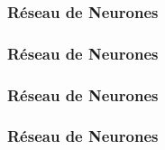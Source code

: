 \documentclass{formation}
\begin{document}
\begin{frame}
  \frametitle{Réseau de Neurones}
  
\end{frame}

\begin{frame}
  \frametitle{Réseau de Neurones}
\end{frame}

\begin{frame}
  \frametitle{Réseau de Neurones}
\end{frame}

\begin{frame}
  \frametitle{Réseau de Neurones}
\end{frame}
\end{document}
